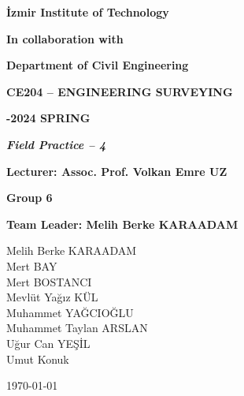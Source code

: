 \documentclass[12pt]{report}
\author{Muhammet Yağcıoğlu - 290204042}
\begin{document}
\onecolumn
\thispagestyle{empty}
\begin{center}


\textbf{\fontsize{14}{\baselineskip}\selectfont İzmir Institute of Technology}


\textbf{\fontsize{14}{\baselineskip}\selectfont In collaboration with}


\textbf{\fontsize{14}{\baselineskip}\selectfont Department of Civil Engineering}

\bigskip



\bigskip

\textbf{\fontsize{15}{\baselineskip}\selectfont CE204 – ENGINEERING
SURVEYING}

\bigskip

\textbf{\fontsize{16}{\baselineskip}-2024 SPRING}







\textit{\textbf{\fontsize{14}{\baselineskip}\selectfont Field Practice – 4}}






\textbf{\fontsize{14}{\baselineskip}\selectfont Lecturer: Assoc. Prof. Volkan Emre UZ }

\bigskip

\textbf{\fontsize{14}{\baselineskip}\selectfont Group 6}

\bigskip

\textbf{\fontsize{14}{\baselineskip}\selectfont Team Leader: Melih Berke	KARAADAM}

\bigskip

Melih Berke	KARAADAM\\
Mert BAY\\
Mert BOSTANCI \\
Mevlüt Yağız KÜL\\
Muhammet YAĞCIOĞLU\\
Muhammet Taylan ARSLAN\\
Uğur Can YEŞİL \\
Umut Konuk\\



\bigskip

\bigskip

\bigskip

{\today}
\end{center}

\clearpage
\end{document}
